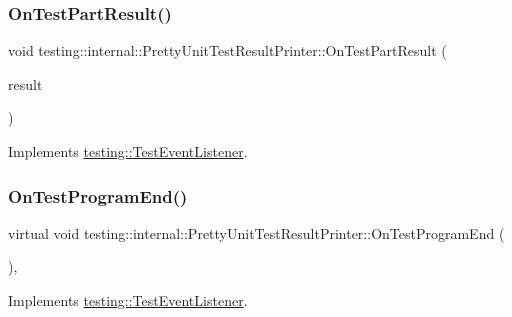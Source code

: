 \subsubsection{\texorpdfstring{OnTestPartResult()}{OnTestPartResult()}}
{\footnotesize\ttfamily void testing\+::internal\+::\+Pretty\+Unit\+Test\+Result\+Printer\+::\+On\+Test\+Part\+Result (\begin{DoxyParamCaption}\item[{const Test\+Part\+Result \&}]{result }\end{DoxyParamCaption})\hspace{0.3cm}{\ttfamily [virtual]}}



Implements \mbox{\hyperlink{classtesting_1_1TestEventListener_a054f8705c883fa120b91473aff38f2ee}{testing\+::\+Test\+Event\+Listener}}.

\mbox{\label{classtesting_1_1internal_1_1PrettyUnitTestResultPrinter_a8c92c062889abdb940b04ffe113f5980}} 
\subsubsection{\texorpdfstring{OnTestProgramEnd()}{OnTestProgramEnd()}}
{\footnotesize\ttfamily virtual void testing\+::internal\+::\+Pretty\+Unit\+Test\+Result\+Printer\+::\+On\+Test\+Program\+End (\begin{DoxyParamCaption}\item[{const \mbox{\hyperlink{classtesting_1_1UnitTest}{Unit\+Test}} \&}]{ }\end{DoxyParamCaption})\hspace{0.3cm}{\ttfamily [inline]}, {\ttfamily [virtual]}}



Implements \mbox{\hyperlink{classtesting_1_1TestEventListener_ad15b6246d94c268e233487a86463ef3d}{testing\+::\+Test\+Event\+Listener}}.

\mbox{\label{classtesting_1_1internal_1_1PrettyUnitTestResultPrinter_a7a6b6de195b4ef3c9f2edd2e6c270f3e}} 

